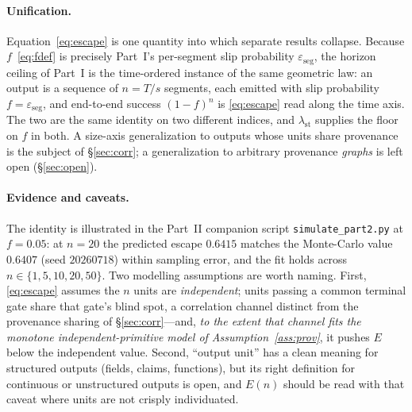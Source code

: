 \documentclass[11pt]{article}
\theoremstyle{definition}
\theoremstyle{remark}
\newcommand{\lst}{\lambda_{\mathrm{st}}}
\newcommand{\eseg}{\varepsilon_{\mathrm{seg}}}
\newcommand{\Esc}{E}
\newcommand{\fesc}{f}
\begin{document}
\paragraph{Unification.}
Equation~\eqref{eq:escape} is one quantity into which separate results collapse. Because
$\fesc$~\eqref{eq:fdef} is precisely Part~I's per-segment slip probability $\eseg$, the horizon ceiling
of Part~I is the time-ordered instance of the same geometric law: an output is a sequence of $n=T/s$
segments, each emitted with slip probability $\fesc=\eseg$, and end-to-end success $(1-\fesc)^n$ is
\eqref{eq:escape} read along the time axis. The two are the same identity on two different indices, and
$\lst$ supplies the floor on $\fesc$ in both. A size-axis generalization to outputs whose units share
provenance is the subject of \S\ref{sec:corr}; a generalization to arbitrary provenance \emph{graphs}
is left open (\S\ref{sec:open}).

\paragraph{Evidence and caveats.}
The identity is illustrated in the Part~II companion script \texttt{simulate\_part2.py} at $\fesc=0.05$:
at $n=20$ the predicted escape $0.6415$ matches the Monte-Carlo value $0.6407$ (seed $20260718$) within
sampling error, and the fit holds across $n\in\{1,5,10,20,50\}$. Two modelling assumptions are worth
naming. First, \eqref{eq:escape} assumes the $n$ units are \emph{independent}; units passing a common
terminal gate share that gate's blind spot, a correlation channel distinct from the provenance sharing
of \S\ref{sec:corr}---and, \emph{to the extent that channel fits the monotone independent-primitive
model of Assumption~\ref{ass:prov}}, it pushes $\Esc$ below the independent value. Second, ``output
unit'' has a clean meaning for structured
outputs (fields, claims, functions), but its right definition for continuous or unstructured outputs is
open, and $\Esc(n)$ should be read with that caveat where units are not crisply individuated.
\end{document}

